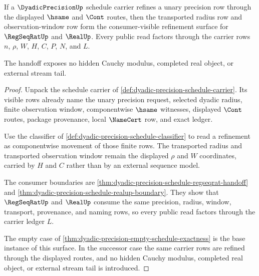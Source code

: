 \begin{theorem}
\label{thm:dyadic-precision-monotone-refinement-handoff}
If a $\DyadicPrecisionUp$ schedule carrier refines a unary precision row through
the displayed $\hsame$ and $\Cont$ routes, then the transported radius row and
observation-window row form the consumer-visible refinement surface for
$\RegSeqRatUp$ and $\RealUp$. Every public read factors through the carrier rows
$n$, $\rho$, $W$, $H$, $C$, $P$, $N$, and $L$.

The handoff exposes no hidden Cauchy modulus, completed real object, or external
stream tail.
\end{theorem}
\begin{proof}
Unpack the schedule carrier of
\autoref{def:dyadic-precision-schedule-carrier}. Its visible rows already name
the unary precision request, selected dyadic radius, finite observation window,
componentwise $\hsame$ witnesses, displayed $\Cont$ routes, package provenance,
local $\NameCert$ row, and exact ledger.

Use the classifier of \autoref{def:dyadic-precision-schedule-classifier} to read
a refinement as componentwise movement of those finite rows. The transported
radius and transported observation window remain the displayed $\rho$ and $W$
coordinates, carried by $H$ and $C$ rather than by an external sequence model.

The consumer boundaries are
\autoref{thm:dyadic-precision-schedule-regseqrat-handoff} and
\autoref{thm:dyadic-precision-schedule-realup-boundary}. They show that
$\RegSeqRatUp$ and $\RealUp$ consume the same precision, radius, window,
transport, provenance, and naming rows, so every public read factors through the
carrier ledger $L$.

The empty case of \autoref{thm:dyadic-precision-empty-schedule-exactness} is the
base instance of this surface. In the successor case the same carrier rows are
refined through the displayed routes, and no hidden Cauchy modulus, completed
real object, or external stream tail is introduced.
\end{proof}

